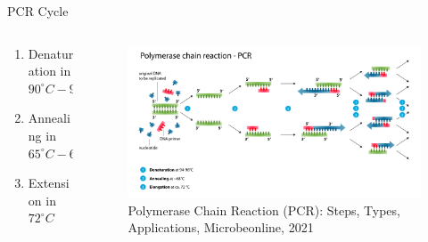 \documentclass[UKenglish, aspectratio = 169]{beamer}
\begin{document}
\begin{frame}{PCR Cycle}
	\begin{columns}
		\begin{column}{0.4\textwidth}
			\begin{enumerate}[<+->]
				\item<1-> Denaturation in $90^\circ C-95^\circ C$
				\item<2-> Annealing in $65^\circ C-68^\circ C$
				\item<3-> Extension in $72^\circ C$
			\end{enumerate}
		\end{column}
			\begin{column}{0.6\textwidth}
				\onslide<1->
		\begin{figure}
			\centering
			\parbox{\linewidth}{\includegraphics[scale=0.12]{figs/pcr_chain.png}}
			\caption{\tiny{Polymerase Chain Reaction (PCR):  Steps, Types, Applications, Microbeonline, 2021}}
		\end{figure}
	\end{column}
	\end{columns}
\end{frame}
\end{document}
